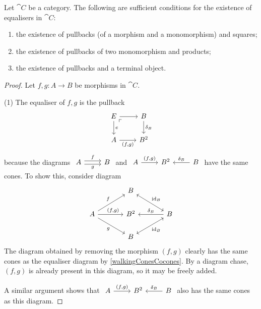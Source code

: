 \begin{proposition}
Let $\cat{C}$ be a category. The following are sufficient conditions for the existence of equalisers in $\cat{C}$:
\begin{enumerate}
\item the existence of pullbacks (of a morphism and a monomorphism) and squares;
\item the existence of pullbacks of two monomorphism and products;
\item the existence of pullbacks and a terminal object.
\end{enumerate}
\end{proposition}
\begin{proof}
Let $f,g: A\to B$ be morphisms in $\cat{C}$.

(1) The equaliser of $f,g$ is the pullback
\[ \begin{tikzcd}
E \arrow[r] \arrow[d, "e"] \pbCorner & B \arrow[d, "{\delta_B}"] \\
A \arrow[r, swap, "{(f,g)}"] & B^2
\end{tikzcd} \]
because the diagrams $\begin{tikzcd}
A \ar[r, shift left, "f"] \ar[r, shift right, swap, "g"] & B
\end{tikzcd}$ and $\begin{tikzcd}
A \ar[r, "{(f,g)}"] & B^2 & \ar[l, swap, "{\delta_B}"] B
\end{tikzcd}$ have the same cones. To show this, consider diagram
\[ \begin{tikzcd}[column sep=large]
& B \ar[dr, leftrightarrow, "{\id_B}"] & \\
A \ar[r, pos=0.6, "{(f,g)}"] \ar[ur, "f"] \ar[dr, swap, "g"] & B^2 & \ar[l, swap, "{\delta_B}"] B \\
& B \ar[ur,swap, leftrightarrow, "{\id_B}"] &
\end{tikzcd} \]
The diagram obtained by removing the morphism $(f,g)$ clearly has the same cones as the equaliser diagram by \ref{walkingConesCocones}. By a diagram chase, $(f,g)$ is already present in this diagram, so it may be freely added.

A similar argument shows that $\begin{tikzcd}
A \ar[r, "{(f,g)}"] & B^2 & \ar[l, swap, "{\delta_B}"] B
\end{tikzcd}$ also has the same cones as this diagram.


\end{proof}
